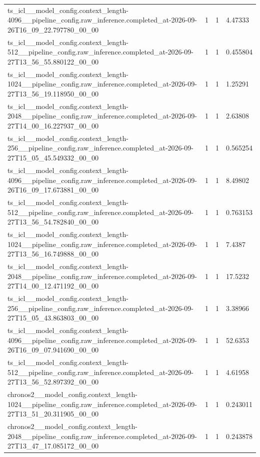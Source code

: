 \begin{tabular}{llll}
ts\_icl\_\_model\_config.context\_length-4096\_\_pipeline\_config.raw\_inference.completed\_at-2026-09-26T16\_09\_22.797780\_00\_00 & 1 & 1 & 4.47333 \\
ts\_icl\_\_model\_config.context\_length-512\_\_pipeline\_config.raw\_inference.completed\_at-2026-09-27T13\_56\_55.880122\_00\_00 & 1 & 1 & 0.455804 \\
ts\_icl\_\_model\_config.context\_length-1024\_\_pipeline\_config.raw\_inference.completed\_at-2026-09-27T13\_56\_19.118950\_00\_00 & 1 & 1 & 1.25291 \\
ts\_icl\_\_model\_config.context\_length-2048\_\_pipeline\_config.raw\_inference.completed\_at-2026-09-27T14\_00\_16.227937\_00\_00 & 1 & 1 & 2.63808 \\
ts\_icl\_\_model\_config.context\_length-256\_\_pipeline\_config.raw\_inference.completed\_at-2026-09-27T15\_05\_45.549332\_00\_00 & 1 & 1 & 0.565254 \\
ts\_icl\_\_model\_config.context\_length-4096\_\_pipeline\_config.raw\_inference.completed\_at-2026-09-26T16\_09\_17.673881\_00\_00 & 1 & 1 & 8.49802 \\
ts\_icl\_\_model\_config.context\_length-512\_\_pipeline\_config.raw\_inference.completed\_at-2026-09-27T13\_56\_54.782840\_00\_00 & 1 & 1 & 0.763153 \\
ts\_icl\_\_model\_config.context\_length-1024\_\_pipeline\_config.raw\_inference.completed\_at-2026-09-27T13\_56\_16.749888\_00\_00 & 1 & 1 & 7.4387 \\
ts\_icl\_\_model\_config.context\_length-2048\_\_pipeline\_config.raw\_inference.completed\_at-2026-09-27T14\_00\_12.471192\_00\_00 & 1 & 1 & 17.5232 \\
ts\_icl\_\_model\_config.context\_length-256\_\_pipeline\_config.raw\_inference.completed\_at-2026-09-27T15\_05\_43.863803\_00\_00 & 1 & 1 & 3.38966 \\
ts\_icl\_\_model\_config.context\_length-4096\_\_pipeline\_config.raw\_inference.completed\_at-2026-09-26T16\_09\_07.941690\_00\_00 & 1 & 1 & 52.6353 \\
ts\_icl\_\_model\_config.context\_length-512\_\_pipeline\_config.raw\_inference.completed\_at-2026-09-27T13\_56\_52.897392\_00\_00 & 1 & 1 & 4.61958 \\
chronos2\_\_model\_config.context\_length-1024\_\_pipeline\_config.raw\_inference.completed\_at-2026-09-27T13\_51\_20.311905\_00\_00 & 1 & 1 & 0.243011 \\
chronos2\_\_model\_config.context\_length-2048\_\_pipeline\_config.raw\_inference.completed\_at-2026-09-27T13\_47\_17.085172\_00\_00 & 1 & 1 & 0.243878 \\

\end{tabular}

